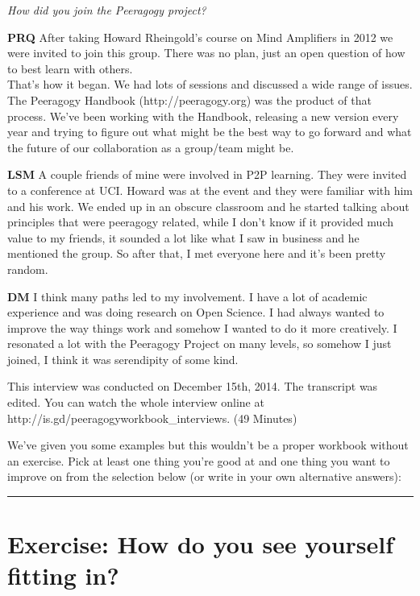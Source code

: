\emph{How did you join the Peeragogy project?}

\textbf{PRQ} After taking Howard Rheingold's course on Mind Amplifiers
in 2012 we were invited to join this group. There was no plan, just an
open question of how to best learn with others.\\
That's how it began. We had lots of sessions and discussed a wide range
of issues. The Peeragogy Handbook (http://peeragogy.org) was the product
of that process. We've been working with the Handbook, releasing a new
version every year and trying to figure out what might be the best way
to go forward and what the future of our collaboration as a group/team
might be.

\textbf{LSM} A couple friends of mine were involved in P2P learning.
They were invited to a conference at UCI. Howard was at the event and
they were familiar with him and his work. We ended up in an obscure
classroom and he started talking about principles that were peeragogy
related, while I don't know if it provided much value to my friends, it
sounded a lot like what I saw in business and he mentioned the group. So
after that, I met everyone here and it's been pretty random.

\textbf{DM} I think many paths led to my involvement. I have a lot of
academic experience and was doing research on Open Science. I had always
wanted to improve the way things work and somehow I wanted to do it more
creatively. I resonated a lot with the Peeragogy Project on many levels,
so somehow I just joined, I think it was serendipity of some kind.

This interview was conducted on December 15th, 2014. The transcript was
edited. You can watch the whole interview online at
http://is.gd/peeragogyworkbook\_interviews. (49 Minutes)

We've given you some examples but this wouldn't be a proper workbook
without an exercise. Pick at least one thing you're good at and one
thing you want to improve on from the selection below (or write in your
own alternative answers):

\begin{center}\rule{0.5\linewidth}{\linethickness}\end{center}

\section{Exercise: How do you see yourself fitting
in?}\label{exercise-how-do-you-see-yourself-fitting-in}


